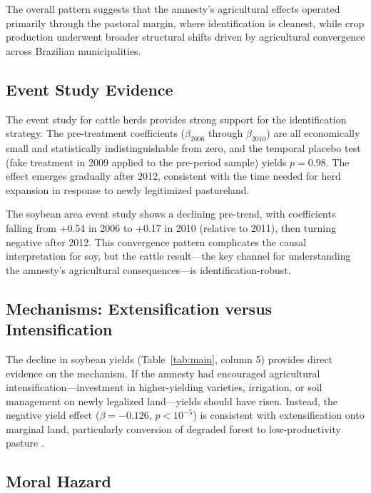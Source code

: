\documentclass[12pt]{article}
\begin{document}
The overall pattern suggests that the amnesty's agricultural effects operated primarily through the pastoral margin, where identification is cleanest, while crop production underwent broader structural shifts driven by agricultural convergence across Brazilian municipalities.

\subsection{Event Study Evidence}

The event study for cattle herds provides strong support for the identification strategy. The pre-treatment coefficients ($\beta_{2006}$ through $\beta_{2010}$) are all economically small and statistically indistinguishable from zero, and the temporal placebo test (fake treatment in 2009 applied to the pre-period sample) yields $p = 0.98$. The effect emerges gradually after 2012, consistent with the time needed for herd expansion in response to newly legitimized pastureland.

The soybean area event study shows a declining pre-trend, with coefficients falling from +0.54 in 2006 to +0.17 in 2010 (relative to 2011), then turning negative after 2012. This convergence pattern complicates the causal interpretation for soy, but the cattle result---the key channel for understanding the amnesty's agricultural consequences---is identification-robust.

\subsection{Mechanisms: Extensification versus Intensification}

The decline in soybean yields (Table~\ref{tab:main}, column 5) provides direct evidence on the mechanism. If the amnesty had encouraged agricultural intensification---investment in higher-yielding varieties, irrigation, or soil management on newly legalized land---yields should have risen. Instead, the negative yield effect ($\beta = -0.126$, $p < 10^{-5}$) is consistent with extensification onto marginal land, particularly conversion of degraded forest to low-productivity pasture \citep{lapola2014pervasive}.

\subsection{Moral Hazard}


\end{document}
